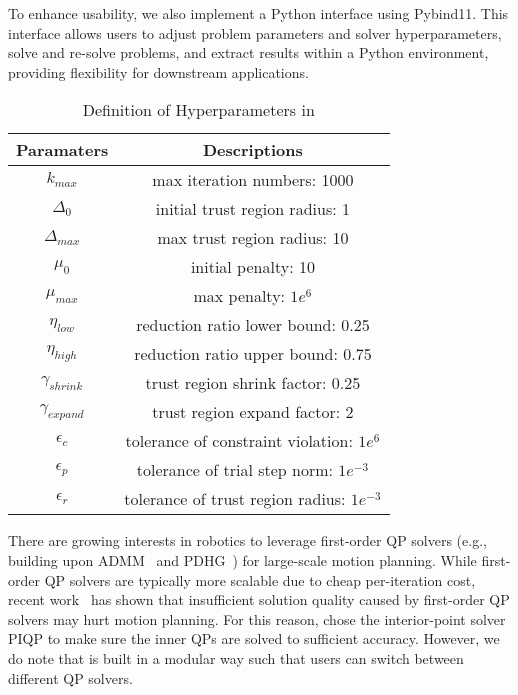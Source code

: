 To enhance usability, we also implement a Python interface using Pybind11. This interface allows users to adjust problem parameters and solver hyperparameters, solve and re-solve problems, and extract results within a Python environment, providing flexibility for downstream applications.

\begin{table}[ht]
    \centering
    \caption{Definition of Hyperparameters in }
    \begin{tabular}{ cc }
    \toprule[1pt]
    \textbf{Paramaters} & \textbf{Descriptions}\\
    \midrule
    $k_{max}$ & max iteration numbers: 1000 \\
    $\Delta_0$ & initial trust region radius: 1\\
    $\Delta_{max}$ & max trust region radius: 10\\
    $\mu_0$ & initial penalty: 10\\
    $\mu_{max}$ & max penalty: $1e^6$\\
    $\eta_{low}$ & reduction ratio lower bound: 0.25\\
    $\eta_{high}$ & reduction ratio upper bound: 0.75\\
    $\gamma_{shrink}$ & trust region shrink factor: 0.25\\
    $\gamma_{expand}$ & trust region expand factor: 2\\
    $\epsilon_c$ & tolerance of constraint violation: $1e^6$\\
    $\epsilon_p$ & tolerance of trial step norm: $1e^{-3}$\\
    $\epsilon_r$ & tolerance of trust region radius: $1e^{-3}$\\ 
    \bottomrule[1pt]
    \end{tabular}
    \label{tab:hyperparameters}
\end{table}
\begin{remark}\label{remark:fom_qp}
    There are growing interests in robotics to leverage first-order QP solvers (e.g., building upon ADMM~\cite{stellato20mpc-osqp} and PDHG~\cite{lu2023practical}) for large-scale motion planning. While first-order QP solvers are typically more scalable due to cheap per-iteration cost, recent work~\cite{khazoom2024tailoring} has shown that insufficient solution quality caused by first-order QP solvers may hurt motion planning. For this reason, \crisp chose the interior-point solver PIQP to make sure the inner QPs are solved to sufficient accuracy. However, we do note that \crisp is built in a modular way such that users can switch between different QP solvers. 
\end{remark}


